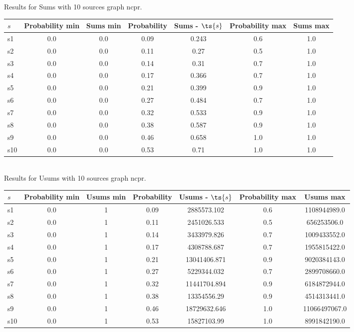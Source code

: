 \documentclass{article}
\begin{document}
\noindent Results for Sums with 10 sources graph ncpr.

\noindent\begin{tabular}{|l|c|c|c|c|c|c|}
\hline
$s$& Probability min & Sums min & Probability & Sums - $\ts{s}$ & Probability max & Sums max\\
\hline
s1 &0.0 & 0.0 & 0.09 & 0.243 & 0.6 & 1.0\\
\hline
s2 &0.0 & 0.0 & 0.11 & 0.27 & 0.5 & 1.0\\
\hline
s3 &0.0 & 0.0 & 0.14 & 0.31 & 0.7 & 1.0\\
\hline
s4 &0.0 & 0.0 & 0.17 & 0.366 & 0.7 & 1.0\\
\hline
s5 &0.0 & 0.0 & 0.21 & 0.399 & 0.9 & 1.0\\
\hline
s6 &0.0 & 0.0 & 0.27 & 0.484 & 0.7 & 1.0\\
\hline
s7 &0.0 & 0.0 & 0.32 & 0.533 & 0.9 & 1.0\\
\hline
s8 &0.0 & 0.0 & 0.38 & 0.587 & 0.9 & 1.0\\
\hline
s9 &0.0 & 0.0 & 0.46 & 0.658 & 1.0 & 1.0\\
\hline
s10 &0.0 & 0.0 & 0.53 & 0.71 & 1.0 & 1.0\\
\hline
\end{tabular}\\

\noindent Results for Usums with 10 sources graph ncpr.

\noindent\begin{tabular}{|l|c|c|c|c|c|c|}
\hline
$s$& Probability min & Usums min & Probability & Usums - $\ts{s}$ & Probability max & Usums max\\
\hline
s1 &0.0 & 1 & 0.09 & 2885573.102 & 0.6 & 1108944989.0\\
\hline
s2 &0.0 & 1 & 0.11 & 2451026.533 & 0.5 & 656253506.0\\
\hline
s3 &0.0 & 1 & 0.14 & 3433979.826 & 0.7 & 1009433552.0\\
\hline
s4 &0.0 & 1 & 0.17 & 4308788.687 & 0.7 & 1955815422.0\\
\hline
s5 &0.0 & 1 & 0.21 & 13041406.871 & 0.9 & 9020384143.0\\
\hline
s6 &0.0 & 1 & 0.27 & 5229344.032 & 0.7 & 2899708660.0\\
\hline
s7 &0.0 & 1 & 0.32 & 11441704.894 & 0.9 & 6184872944.0\\
\hline
s8 &0.0 & 1 & 0.38 & 13354556.29 & 0.9 & 4514313441.0\\
\hline
s9 &0.0 & 1 & 0.46 & 18729632.646 & 1.0 & 11066497067.0\\
\hline
s10 &0.0 & 1 & 0.53 & 15827103.99 & 1.0 & 8991842190.0\\
\hline
\end{tabular}\\
\end{document}
